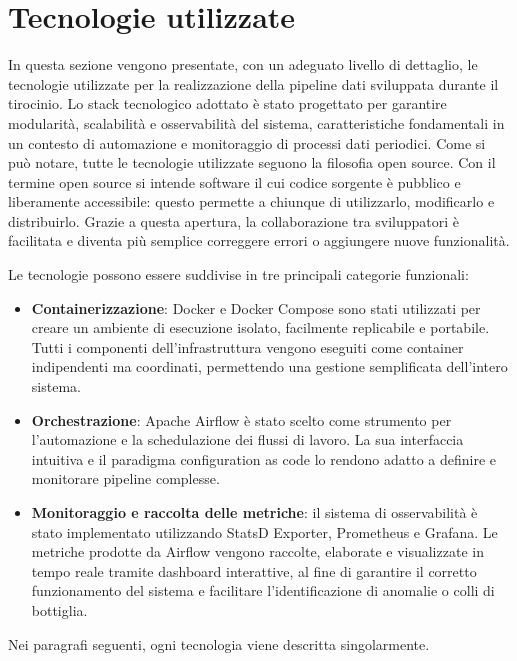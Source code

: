 \chapter{Tecnologie utilizzate}
\label{cha:tecnologieutilizzate}
In questa sezione vengono presentate, con un adeguato livello di dettaglio, le tecnologie utilizzate per la realizzazione della pipeline dati sviluppata durante il tirocinio. Lo stack tecnologico adottato è stato progettato per garantire modularità, scalabilità e osservabilità del sistema, caratteristiche fondamentali in un contesto di automazione e monitoraggio di processi dati periodici. Come si può notare, tutte le tecnologie utilizzate seguono la filosofia open source. Con il termine open source si intende software il cui codice sorgente è pubblico e liberamente accessibile: questo permette a chiunque di utilizzarlo, modificarlo e distribuirlo. Grazie a questa apertura, la collaborazione tra sviluppatori è facilitata e diventa più semplice correggere errori o aggiungere nuove funzionalità.


Le tecnologie possono essere suddivise in tre principali categorie funzionali:

\begin{itemize}
    \item \textbf{Containerizzazione}: Docker e Docker Compose sono stati utilizzati per creare un ambiente di esecuzione isolato, facilmente replicabile e portabile. Tutti i componenti dell'infrastruttura vengono eseguiti come container indipendenti ma coordinati, permettendo una gestione semplificata dell'intero sistema.
    \item \textbf{Orchestrazione}: Apache Airflow è stato scelto come strumento per l'automazione e la schedulazione dei flussi di lavoro. La sua interfaccia intuitiva e il paradigma configuration as code lo rendono adatto a definire e monitorare pipeline complesse.
    \item \textbf{Monitoraggio e raccolta delle metriche}: il sistema di osservabilità è stato implementato utilizzando StatsD Exporter, Prometheus e Grafana. Le metriche prodotte da Airflow vengono raccolte, elaborate e visualizzate in tempo reale tramite dashboard interattive, al fine di garantire il corretto funzionamento del sistema e facilitare l'identificazione di anomalie o colli di bottiglia.
\end{itemize}

Nei paragrafi seguenti, ogni tecnologia viene descritta singolarmente.




